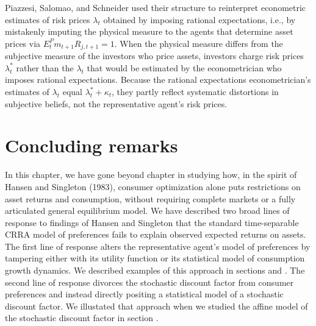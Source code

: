 
 Piazzesi, Salomao, and Schneider used their structure to reinterpret econometric  estimates of risk prices
$\lambda_t$ obtained by imposing rational expectations, i.e., by mistakenly imputing the physical measure to the agents that determine asset prices via $E_t^P m_{t+1} R_{j,t+1} =1$.
When the physical measure differs from the  subjective measure of the investors who price assets,
 investors charge risk prices $\lambda_t^*$
rather than the $\lambda_t$ that would be estimated by the econometrician who imposes rational expectations.  Because the rational expectations econometrician's estimates of
$\lambda_t$ equal $\lambda_t^* + \kappa_t$, they partly reflect systematic distortions in subjective beliefs, not the representative agent's risk prices.%





\section{Concluding remarks}%
In this chapter, we
have gone beyond chapter   in studying how, in the
spirit of Hansen and Singleton (1983),
consumer optimization alone puts restrictions on asset
returns and   consumption,  without requiring complete
markets or a fully articulated general equilibrium model.
We have described two broad lines of response to findings of Hansen and Singleton that the standard time-separable CRRA model of preferences fails to explain observed expected returns on assets.  The first line of response  alters  the representative agent's model  of preferences by tampering 
either with its utility function or its statistical model of consumption growth dynamics. We described examples of this approach in sections  and .  The second line of response  divorces  the stochastic discount factor  from consumer preferences and instead directly positing a statistical model of a stochastic discount factor. We illustated that approach when we studied the affine model of the stochastic discount factor in section .
%


